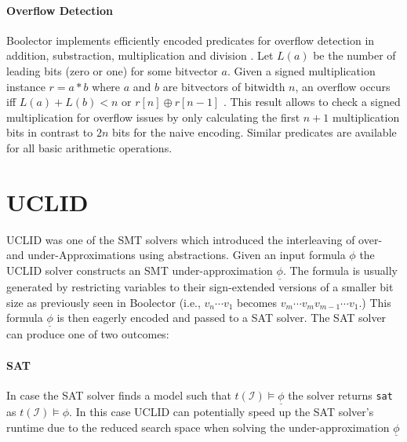 \paragraph{Overflow Detection}
Boolector implements efficiently encoded predicates for overflow detection in addition, substraction, multiplication and division \cite{Brummayer-PhD}. Let $L\left(a\right)$ be the number of leading bits (zero or one) for some bitvector $a$. Given a signed multiplication instance $r=a*b$ where $a$ and $b$ are bitvectors of bitwidth $n$, an overflow occurs iff $L\left(a\right) + L\left(b\right) < n$ or $r\left[n\right] \oplus r\left[n-1\right]$ \cite{schulteGokMulOv}. This result allows to check a signed multiplication for overflow issues by only calculating the first $n+1$ multiplication bits in contrast to $2n$ bits for the naive encoding. Similar predicates are available for all basic arithmetic operations.

\section{UCLID}
\textsc{UCLID} \cite{Bryant2007_Chapter_DecidingBit-VectorArithmeticWi-UCLID} was one of the SMT solvers which introduced the interleaving of over- and under-Approximations using abstractions. Given an input formula $\phi$ the \textsc{UCLID} solver constructs an SMT under-approximation $\underline{\phi}$. The formula is usually generated by restricting variables to their sign-extended versions of a smaller bit size as previously seen in Boolector (i.e., $v_n\dotsi v_1$ becomes $v_m\dotsi v_m v_{m-1}\dotsi v_1$.) This formula $\underline{\phi}$ is then eagerly encoded and passed to a SAT solver. The SAT solver can produce one of two outcomes:

\paragraph{SAT} In case the SAT solver finds a model such that $t\left(\mathcal{I}\right)\vDash\underline{\phi}$ the solver returns \texttt{sat} as $t\left(\mathcal{I}\right)\vDash\phi$. In this case \textsc{UCLID} can potentially speed up the SAT solver's runtime due to the reduced search space when solving the under-approximation $\underline{\phi}$


